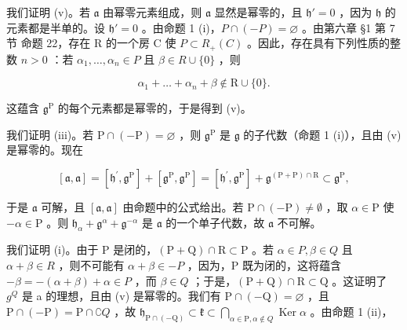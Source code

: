 我们证明 (v)。若 \(\mathfrak{a}\) 由幂零元素组成，则 \(\mathfrak{a}\) 显然是幂零的，且 \(\mathfrak{h}' = 0\) ，因为 \(\mathfrak{h}\) 的元素都是半单的。设 \(\mathfrak{h}' = 0\) 。由命题 1 (i)，\(P \cap (-P) = \varnothing\) 。由第六章 §1 第 7 节 命题 22，存在 R 的一个房 C 使 \(P \subset R_{+}(C)\) 。因此，存在具有下列性质的整数 \(n > 0\) ：若 \(\alpha_{1}, \ldots, \alpha_{n} \in P\) 且 \(\beta \in R \cup \{0\}\) ，则

\[
\alpha_ {1} + \dots + \alpha_ {n} + \beta \notin \mathrm{R} \cup \{0 \}.
\]

这蕴含 \(\mathfrak{g}^{\mathrm{P}}\) 的每个元素都是幂零的，于是得到 (v)。

我们证明 (iii)。若 \(\mathrm{P} \cap (-\mathrm{P}) = \varnothing\) ，则 \(\mathfrak{g}^{\mathrm{P}}\) 是 \(\mathfrak{g}\) 的子代数（命题 1 (i)），且由 (v) 是幂零的。现在

\[
[ \mathfrak {a}, \mathfrak {a} ] = [ \mathfrak {h} ^ {\prime}, \mathfrak {g} ^ {\mathrm{P}} ] + [ \mathfrak {g} ^ {\mathrm{P}}, \mathfrak {g} ^ {\mathrm{P}} ] = [ \mathfrak {h} ^ {\prime}, \mathfrak {g} ^ {\mathrm{P}} ] + \mathfrak {g} ^ {(\mathrm{P} + \mathrm{P}) \cap \mathrm{R}} \subset \mathfrak {g} ^ {\mathrm{P}},
\]

于是 \(\mathfrak{a}\) 可解，且 \([\mathfrak{a},\mathfrak{a}]\) 由命题中的公式给出。若 \(\mathrm{P}\cap (-\mathrm{P})\neq \emptyset\) ，取 \(\alpha \in \mathrm{P}\) 使 \(-\alpha \in \mathrm{P}\) 。则 \(\mathfrak{h}_{\alpha} + \mathfrak{g}^{\alpha} + \mathfrak{g}^{-\alpha}\) 是 \(\mathfrak{a}\) 的一个单子代数，故 \(\mathfrak{a}\) 不可解。

我们证明 (i)。由于 P 是闭的，\((\mathrm{P} + \mathrm{Q}) \cap \mathrm{R} \subset \mathrm{P}\) 。若 \(\alpha \in P, \beta \in Q\) 且 \(\alpha + \beta \in R\) ，则不可能有 \(\alpha + \beta \in -P\) ，因为，P 既为闭的，这将蕴含 \(-\beta = -(\alpha + \beta) + \alpha \in P\) ，而 \(\beta \in Q\) ；于是，\((\mathrm{P} + \mathrm{Q}) \cap \mathrm{R} \subset \mathrm{Q}\) 。这证明了 \(g^{Q}\) 是 a 的理想，且由 (v) 是幂零的。我们有 \(\mathrm{P} \cap (-\mathrm{Q}) = \varnothing\) ，且 \(\mathrm{P} \cap (-\mathrm{P}) = \mathrm{P} \cap \complement Q\) ，故 \(\mathfrak{h}_{\mathrm{P} \cap (-\mathrm{Q})} \subset \mathfrak{k} \subset \bigcap_{\alpha \in \mathrm{P}, \alpha \notin Q} \operatorname{Ker} \alpha\) 。由命题 1 (ii)，

